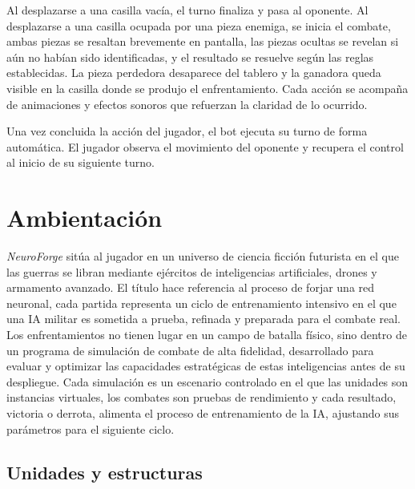 Al desplazarse a una casilla vacía, el turno finaliza y pasa al oponente. Al desplazarse a una casilla ocupada por una pieza enemiga, se inicia el combate, ambas piezas se resaltan brevemente en pantalla, las piezas ocultas se revelan si aún no habían sido identificadas, y el resultado se resuelve según las reglas establecidas. La pieza perdedora desaparece del tablero y la ganadora queda visible en la casilla donde se produjo el enfrentamiento. Cada acción se acompaña de animaciones y efectos sonoros que refuerzan la claridad de lo ocurrido.

Una vez concluida la acción del jugador, el bot ejecuta su turno de forma automática. El jugador observa el movimiento del oponente y recupera el control al inicio de su siguiente turno.

\section{Ambientación}

\textit{NeuroForge} sitúa al jugador en un universo de ciencia ficción futurista en el que las guerras se libran mediante ejércitos de inteligencias artificiales, drones y armamento avanzado. El título hace referencia al proceso de forjar una red neuronal, cada partida representa un ciclo de entrenamiento intensivo en el que una IA militar es sometida a prueba, refinada y preparada para el combate real. Los enfrentamientos no tienen lugar en un campo de batalla físico, sino dentro de un programa de simulación de combate de alta fidelidad, desarrollado para evaluar y optimizar las capacidades estratégicas de estas inteligencias antes de su despliegue. Cada simulación es un escenario controlado en el que las unidades son instancias virtuales, los combates son pruebas de rendimiento y cada resultado, victoria o derrota, alimenta el proceso de entrenamiento de la IA, ajustando sus parámetros para el siguiente ciclo.

\subsection{Unidades y estructuras}

